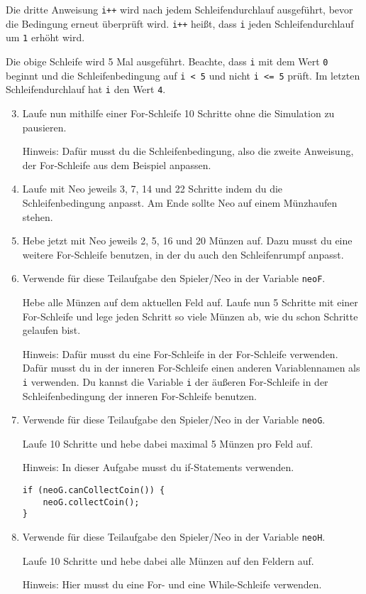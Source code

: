 \begin{Infobox}
	Die dritte Anweisung \lstinline{i++} wird nach jedem Schleifendurchlauf ausgeführt, bevor die Bedingung erneut überprüft wird.
	\lstinline{i++} heißt, dass \lstinline{i} jeden Schleifendurchlauf um \lstinline{1} erhöht wird. 
	
	Die obige Schleife wird 5 Mal ausgeführt.
	Beachte, dass \lstinline{i} mit dem Wert \lstinline{0} beginnt und die Schleifenbedingung auf \lstinline{i < 5} und nicht \lstinline{i <= 5} prüft.
	Im letzten Schleifendurchlauf hat \lstinline{i} den Wert \lstinline{4}.
\end{Infobox}


\begin{enumerate}\setcounter{enumi}{2}
	\item 
		Laufe nun mithilfe einer For-Schleife 10 Schritte ohne die Simulation zu pausieren.

		Hinweis: Dafür musst du die Schleifenbedingung, also die zweite Anweisung, der For-Schleife aus dem Beispiel anpassen.

	\item
		Laufe mit Neo jeweils 3, 7, 14 und 22 Schritte indem du die Schleifenbedingung anpasst.
		Am Ende sollte Neo auf einem Münzhaufen stehen.

	\item
		Hebe jetzt mit Neo jeweils 2, 5, 16 und 20 Münzen auf.
		Dazu musst du eine weitere For-Schleife benutzen, in der du auch den Schleifenrumpf anpasst.

	\item
		Verwende für diese Teilaufgabe den Spieler/Neo in der Variable \lstinline{neoF}.

		Hebe alle Münzen auf dem aktuellen Feld auf. 
		Laufe nun 5 Schritte mit einer For-Schleife und lege jeden Schritt so viele Münzen ab, wie du schon Schritte gelaufen bist.

		Hinweis: Dafür musst du eine For-Schleife in der For-Schleife verwenden. 
		Dafür musst du in der inneren For-Schleife einen anderen Variablennamen als \lstinline{i} verwenden.
		Du kannst die Variable \lstinline{i} der äußeren For-Schleife in der Schleifenbedingung der inneren For-Schleife benutzen.

	\item
		Verwende für diese Teilaufgabe den Spieler/Neo in der Variable \lstinline{neoG}.

		Laufe 10 Schritte und hebe dabei maximal 5 Münzen pro Feld auf.

		Hinweis: In dieser Aufgabe musst du if-Statements verwenden.

		\begin{lstlisting}
if (neoG.canCollectCoin()) {
    neoG.collectCoin();
}
		\end{lstlisting}

	\item
		Verwende für diese Teilaufgabe den Spieler/Neo in der Variable \lstinline{neoH}.

		Laufe 10 Schritte und hebe dabei alle Münzen auf den Feldern auf.

		Hinweis: Hier musst du eine For- und eine While-Schleife verwenden.
\end{enumerate}
\newpage
